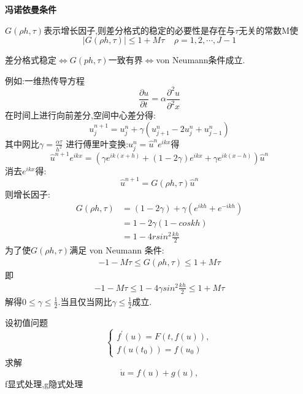 \documentclass[12pt,a4paper]{article}
\begin{document}
\par

\textbf{冯诺依曼条件}

$G(\rho h,\tau )$表示增长因子,则差分格式的稳定的必要性是存在与$\tau$无关的常数M使
\begin{equation}
|G(\rho h,\tau )|\le 1+M\tau ~~~~~\rho=1,2,\cdots,J-1
\end{equation}

差分格式稳定$\Leftrightarrow G(ph,\tau)$一致有界$\Leftrightarrow$von Neumann条件成立.

例如:一维热传导方程
\begin{equation}
\frac{\partial u}{\partial t}=\alpha\frac{\partial^2 u}{\partial^2 x}
\end{equation}
在时间上进行向前差分,空间中心差分得:
\begin{equation}
u_{j}^{n+1}=u_{j}^{n}+\gamma(u_{j+1}^n-2u_{j}^n+u_{j-1}^n)
\end{equation}
其中网比$\gamma=\frac{\alpha\tau}{h^2}$
进行傅里叶变换:$u_{j}^n=\hat{u}^{n}e^{ikx}$得
\begin{equation}
\hat{u}^{n+1}e^{ikx}=(\gamma e^{ik(x+h)}+(1-2\gamma)e^{ikx}+\gamma e^{ik(x-h)})\hat{u}^{n}
\end{equation}
消去$e^{ikx}$得:
\begin{equation}
\hat{u}^{n+1}=G(\rho h,\tau)\hat{u}^n
\end{equation}
则增长因子:
\begin{align}
G(\rho h,\tau)&=(1-2\gamma)+\gamma (e^{ikh}+e^{-ikh})\\
&=1-2\gamma (1-coskh)\\
&=1-4rsin^{2}\frac{kh}{2}
\end{align}
为了使$G(\rho h,\tau)$满足 von Neumann 条件:
\begin{align}
-1-M\tau\le G(\rho h,\tau)\le 1+M\tau
\end{align}
即
\begin{align}
-1-M\tau\le 1-4\gamma sin^2\frac{kh}{2}\le 1+M\tau
\end{align}
解得$0\le \gamma\le \frac{1}{2}$.当且仅当网比$\gamma\le \frac{1}{2}$成立.

\par 


设初值问题
\begin{equation*}
\begin{cases}
f^{'}(u)=F(t,f(u)),\\
f(u(t_{0}))=f(u_{0})
\end{cases}
\end{equation*}
求解
\begin{equation}
\dot{u}=f(u)+g(u),
\label{12}
\end{equation}
f显式处理,g隐式处理
\end{document}
